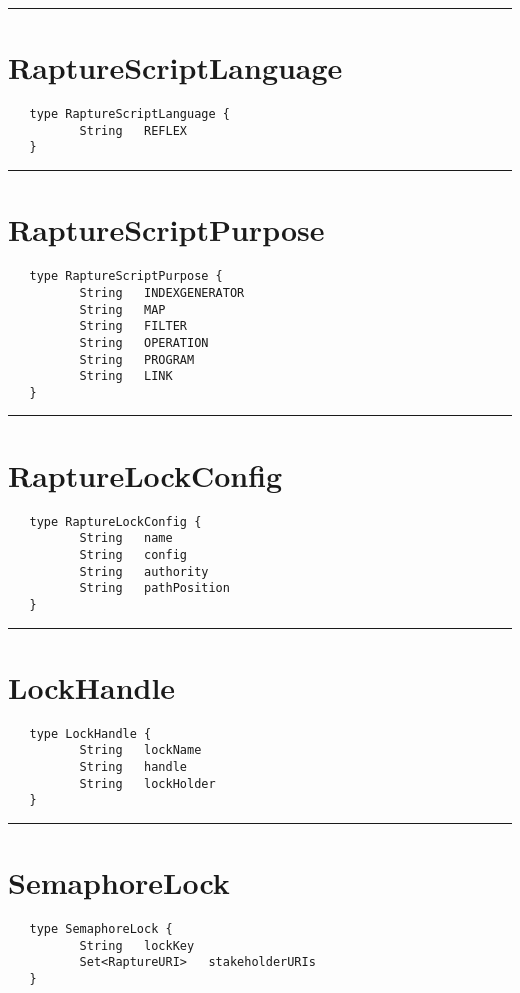 \rule{15cm}{2pt}
\section{RaptureScriptLanguage}
\label{type:RaptureScriptLanguage}

\begin{verbatim}
   type RaptureScriptLanguage {
          String   REFLEX
   }
\end{verbatim}

\rule{15cm}{2pt}
\section{RaptureScriptPurpose}
\label{type:RaptureScriptPurpose}

\begin{verbatim}
   type RaptureScriptPurpose {
          String   INDEXGENERATOR
          String   MAP
          String   FILTER
          String   OPERATION
          String   PROGRAM
          String   LINK
   }
\end{verbatim}

\rule{15cm}{2pt}
\section{RaptureLockConfig}
\label{type:RaptureLockConfig}

\begin{verbatim}
   type RaptureLockConfig {
          String   name
          String   config
          String   authority
          String   pathPosition
   }
\end{verbatim}

\rule{15cm}{2pt}
\section{LockHandle}
\label{type:LockHandle}

\begin{verbatim}
   type LockHandle {
          String   lockName
          String   handle
          String   lockHolder
   }
\end{verbatim}

\rule{15cm}{2pt}
\section{SemaphoreLock}
\label{type:SemaphoreLock}

\begin{verbatim}
   type SemaphoreLock {
          String   lockKey
          Set<RaptureURI>   stakeholderURIs
   }
\end{verbatim}

